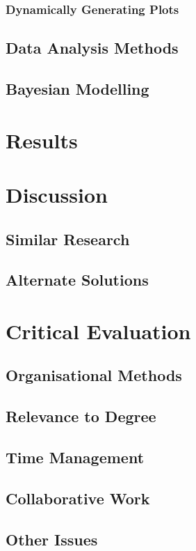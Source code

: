 \documentclass[11pt]{report}
\begin{document}
\subsection{Dynamically Generating Plots}
\label{sec:org6d12c0f}
\section{Data Analysis Methods}
\label{sec:orgc9b7a9c}
\section{Bayesian Modelling}
\label{sec:orgb54d946}


\chapter{Results}
\label{sec:org2c137c9}
\chapter{Discussion}
\label{sec:org88ad15b}
\section{Similar Research}
\label{sec:org54938cf}
\section{Alternate Solutions}
\label{sec:orgacd32d2}
\chapter{Critical Evaluation}
\label{sec:org8d2b34f}
\section{Organisational Methods}
\label{sec:orgb425fb4}
\section{Relevance to Degree}
\label{sec:orge9eee7e}
\section{Time Management}
\label{sec:org5a66a73}
\section{Collaborative Work}
\label{sec:org4c5a7bd}
\section{Other Issues}
\label{sec:org72c4330}
\end{document}
